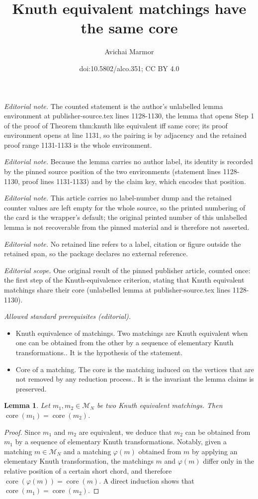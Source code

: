 \documentclass[11pt]{article}
\title{Knuth equivalent matchings have the same core}
\author{Avichai Marmor}
\date{doi:10.5802/alco.351; CC BY 4.0}
\newtheorem{lemma}[theo]{Lemma}
\theoremstyle{definition}
\numberwithin{equation}{section}
\newcommand{\core}{\operatorname{core}}
\newcommand{\M}{\mathcal{M}}
\begin{document}
\maketitle
\noindent\textit{Editorial note.} The counted statement is the author's unlabelled lemma environment at publisher-source.tex lines 1128-1130, the lemma that opens Step 1 of the proof of Theorem thm:knuth like equivalent iff same core; its proof environment opens at line 1131, so the pairing is by adjacency and the retained proof range 1131-1133 is the whole environment.\par\medskip
\noindent\textit{Editorial note.} Because the lemma carries no author label, its identity is recorded by the pinned source position of the two environments (statement lines 1128-1130, proof lines 1131-1133) and by the claim key, which encodes that position.\par\medskip
\noindent\textit{Editorial note.} This article carries no label-number dump and the retained counter values are left empty for the whole source, so the printed numbering of the card is the wrapper's default; the original printed number of this unlabelled lemma is not recoverable from the pinned material and is therefore not asserted.\par\medskip
\noindent\textit{Editorial note.} No retained line refers to a label, citation or figure outside the retained span, so the package declares no external reference.\par\medskip
\noindent\textit{Editorial scope.} One original result of the pinned publisher article, counted once: the first step of the Knuth-equivalence criterion, stating that Knuth equivalent matchings share their core (unlabelled lemma at publisher-source.tex lines 1128-1130).\par\medskip
\noindent\textit{Allowed standard prerequisites (editorial).}\begin{itemize}
\item Knuth equivalence of matchings. Two matchings are Knuth equivalent when one can be obtained from the other by a sequence of elementary Knuth transformations.. It is the hypothesis of the statement.
\item Core of a matching. The core is the matching induced on the vertices that are not removed by any reduction process.. It is the invariant the lemma claims is preserved.
\end{itemize}\medskip
\begin{lemma}
    Let $m_1, m_2 \in \M_N$ be two Knuth equivalent matchings. Then $\core(m_1) = \core(m_2)$.
\end{lemma}

\begin{proof}
    Since $m_1$ and $m_2$ are equivalent, we deduce that $m_2$ can be obtained from $m_1$ by a sequence of elementary Knuth transformations. Notably, given a matching $m \in \M_N$ and a matching $\varphi(m)$ obtained from $m$ by applying an elementary Knuth transformation, the matchings $m$ and $\varphi(m)$ differ only in the relative position of a certain short chord, and therefore $\core(\varphi(m)) = \core(m)$. A direct induction shows that $\core(m_1) = \core(m_2)$.
\end{proof}
\end{document}
